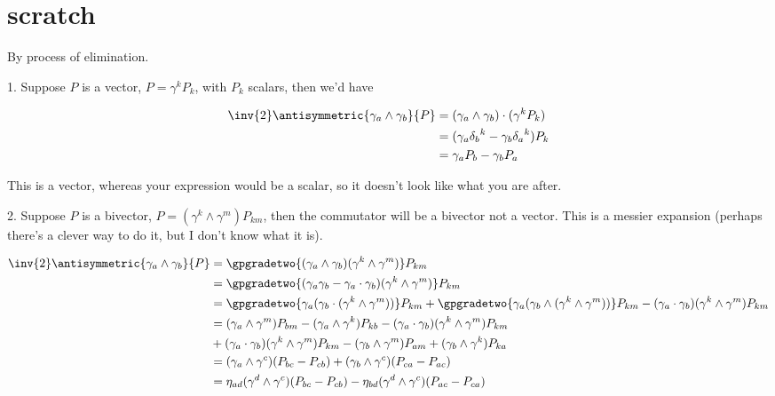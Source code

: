 

\chapter{scratch}

\beginArtNoToc

By process of elimination.

1.  Suppose $P$ is a vector, $P = \gamma^k P_k$, with $P_k$ scalars, then we'd have

\begin{align*}
\inv{2} \antisymmetric{\gamma_a \wedge \gamma_b}{P} 
&= 
(\gamma_a \wedge \gamma_b) \cdot (\gamma^k P_k) \\
&=
(\gamma_a {\delta_b}^k - \gamma_b {\delta_a}^k ) P_k \\
&=
\gamma_a P_b - \gamma_b P_a
\end{align*}

This is a vector, whereas your expression would be a scalar, so it doesn't look like what you are after.

2.  Suppose $P$ is a bivector, $P = (\gamma^k \wedge \gamma^m) P_{km}$, then the commutator will be a bivector not a vector.  This is a messier expansion (perhaps there's a clever way to do it, but I don't know what it is).

\begin{align*}
\inv{2} \antisymmetric{\gamma_a \wedge \gamma_b}{P} 
&= 
\gpgradetwo{ (\gamma_a \wedge \gamma_b) (\gamma^k \wedge \gamma^m) } P_{km} \\
&= 
\gpgradetwo{ (\gamma_a \gamma_b - \gamma_a \cdot \gamma_b) (\gamma^k \wedge \gamma^m) } P_{km} \\
&= 
\gpgradetwo{ \gamma_a (\gamma_b \cdot (\gamma^k \wedge \gamma^m)) } P_{km} 
+ \gpgradetwo{ \gamma_a (\gamma_b \wedge (\gamma^k \wedge \gamma^m)) } P_{km} 
- (\gamma_a \cdot \gamma_b) (\gamma^k \wedge \gamma^m) P_{km} \\
&= 
(\gamma_a \wedge \gamma^m) P_{b m} -(\gamma_a \wedge \gamma^k) P_{k b} - (\gamma_a \cdot \gamma_b) (\gamma^k \wedge \gamma^m) P_{km} \\
&+ (\gamma_a \cdot \gamma_b) (\gamma^k \wedge \gamma^m) P_{km} 
- (\gamma_b \wedge \gamma^m) P_{a m} 
+ (\gamma_b \wedge \gamma^k) P_{k a} 
\\
&= 
(\gamma_a \wedge \gamma^c) (P_{b c} -P_{c b})
+ (\gamma_b \wedge \gamma^c) (P_{c a} -P_{a c} )
\\
&= 
\eta_{ad}(\gamma^d \wedge \gamma^c) (P_{b c} -P_{c b})
- \eta_{bd} (\gamma^d \wedge \gamma^c) ( P_{a c} -P_{c a} )
\\
\end{align*}

